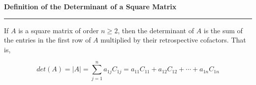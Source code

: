 \nopagenumbers
{\bf Definition of the Determinant of a Square Matrix}
\vskip 1mm
\hrule

\vskip 6pt
If $A$ is a square matrix of order $n\geq 2$, then the determinant of $A$ is the sum of the entries in the first row of $A$ multiplied by their retrospective cofactors. That is,

$$det(A)=|A|=\sum_{j=1}^na_{1j}C_{1j}=a_{11}C_{11}+a_{12}C_{12}+\cdots+a_{1n}C_{1n}$$

\vfill\eject
\bye
